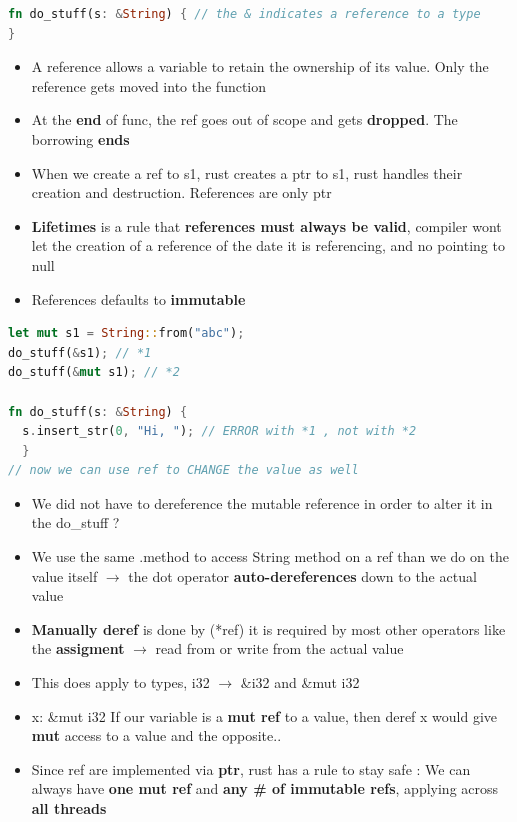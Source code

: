 \documentclass{report}
\begin{document}
\begin{multicols*}{2}
\begin{tcolorbox}[colback=backcolour,size=small,left=4mm]
\begin{lstlisting}[language=rust]
fn do_stuff(s: &String) { // the & indicates a reference to a type
}
\end{lstlisting}
\end{tcolorbox}

\begin{itemize}
  \item A reference allows a variable to retain the ownership of its value. Only the reference gets  moved into the function 
  \item At the \textbf{end} of func, the ref goes out of scope and gets \textbf{dropped}. The borrowing \textbf{ends} 
  \item When we create a ref to s1, rust creates a ptr to s1, rust handles their creation and destruction. References are only ptr 
  \item \textbf{Lifetimes} is a rule that \textbf{references must always be valid}, compiler wont let the creation of a reference of the date it is referencing, and no pointing to null 
  \item References defaults to \textbf{immutable} 
\end{itemize}


\begin{tcolorbox}[title=Mut ref to a mut value,colback=backcolour,size=small,left=4mm]
\begin{lstlisting}[language=rust]
let mut s1 = String::from("abc");
do_stuff(&s1); // *1
do_stuff(&mut s1); // *2

fn do_stuff(s: &String) {
  s.insert_str(0, "Hi, "); // ERROR with *1 , not with *2
  }
// now we can use ref to CHANGE the value as well
\end{lstlisting}
\end{tcolorbox}

\begin{itemize}
  \item We did not have to dereference the mutable reference in order to alter it in the do\_stuff ? 
  \item We use the same .method to access String method on a ref than we do on the value itself
    $\rightarrow$ the dot operator \textbf{auto-dereferences} down to the actual value 
  \item \textbf{Manually deref} is done by (*ref) it is required by most other operators like the \textbf{assigment} $\rightarrow$ read from or write from the actual value 
  \item This does apply to types, i32 $\rightarrow$ \&i32 and \&mut i32 
  \item x: \&mut i32 If our variable is a \textbf{mut ref} to a value, then deref x would give \textbf{mut} access to a value and the opposite.. 
  \item Since ref are implemented via \textbf{ptr}, rust has a rule to stay safe :
    We can always have \textbf{one mut ref} and \textbf{any \# of immutable refs}, applying across \textbf{all threads}  
\end{itemize}


\end{multicols*}
\end{document}
